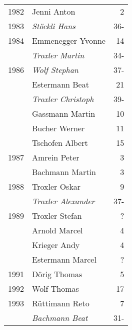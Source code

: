 {\begin{longtable}{ l l r }
        1982          & Jenni Anton                               & 2           \\
        1983          & \emph{Stöckli Hans}                       & 36-         \\
        1984          & Emmenegger Yvonne                         & 14          \\
                      & \emph{Troxler Martin}                     & 34-         \\
        1986          & \emph{Wolf Stephan}                       & 37-         \\
                      & Estermann Beat                            & 21          \\
                      & \emph{Troxler Christoph}                  & 39-         \\
                      & Gassmann Martin                           & 10          \\
                      & Bucher Werner                             & 11          \\
                      & Tschofen Albert                           & 15          \\
        1987          & Amrein Peter                              & 3           \\
                      & Bachmann Martin                           & 3           \\
        1988          & Troxler Oskar                             & 9           \\
                      & \emph{Troxler Alexander}                  & 37-         \\
        1989          & Troxler Stefan                            & ?           \\
                      & Arnold Marcel                             & 4           \\
                      & Krieger Andy                              & 4           \\
                      & Estermann Marcel                          & ?           \\
        1991          & Dörig Thomas                              & 5           \\
        1992          & Wolf Thomas                               & 17          \\
        1993          & Rüttimann Reto                            & 7           \\
                      & \emph{Bachmann Beat}                      & 31-         \\

\end{longtable}}
